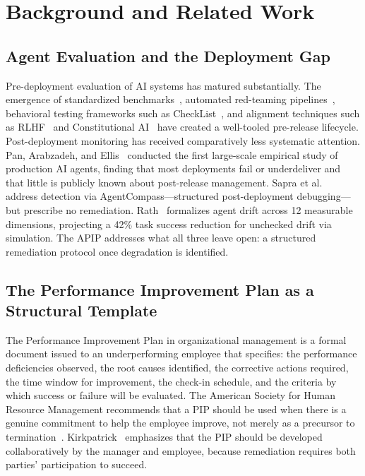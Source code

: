 \section{Background and Related Work}
\label{sec:background}

\subsection{Agent Evaluation and the Deployment Gap}
\label{subsec:deployment-gap}

Pre-deployment evaluation of AI systems has matured substantially. The
emergence of standardized benchmarks~\cite{liang2022holistic}, automated
red-teaming pipelines~\cite{ganguli2022redteaming,perez2022redteaming},
behavioral testing frameworks such as CheckList~\cite{ribeiro2020checklist},
and alignment techniques such as RLHF~\cite{ouyang2022instructions} and
Constitutional AI~\cite{anthropic2023constitutional} have created a well-tooled
pre-release lifecycle. Post-deployment monitoring has received comparatively
less systematic attention. Pan, Arabzadeh, and Ellis~\cite{pan2025measuring}
conducted the first large-scale empirical study of production AI agents,
finding that most deployments fail or underdeliver and that little is publicly
known about post-release management. Sapra et al.~\cite{sapra2025agentcompass}
address detection via AgentCompass---structured post-deployment
debugging---but prescribe no remediation. Rath~\cite{rath2026drift} formalizes
agent drift across 12 measurable dimensions, projecting a 42\% task success
reduction for unchecked drift via simulation. The APIP addresses what all three
leave open: a structured remediation protocol once degradation is identified.

\subsection{The Performance Improvement Plan as a Structural Template}
\label{subsec:pip-template}

The Performance Improvement Plan in organizational management is a formal
document issued to an underperforming employee that specifies: the performance
deficiencies observed, the root causes identified, the corrective actions
required, the time window for improvement, the check-in schedule, and the
criteria by which success or failure will be evaluated. The American Society
for Human Resource Management recommends that a PIP should be used when there
is a genuine commitment to help the employee improve, not merely as a precursor
to termination~\cite{kirkpatrick2016four}.
Kirkpatrick~\cite{kirkpatrick1994evaluating,kirkpatrick2016four} emphasizes
that the PIP should be developed collaboratively by the manager and employee,
because remediation requires both parties' participation to succeed.

